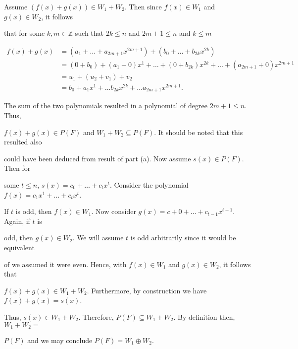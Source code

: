 \documentclass[12pt, a4paper]{article}
\begin{document}
\vspace{2mm}

Assume $(f(x)+g(x))\in W_1+W_2$. Then since $f(x)\in W_1$ and $g(x)\in W_2$, it follows\par that for some $k,m\in\mathbb{Z}$ such that $2k\leq n$ and $2m+1\leq n$ and $k\leq m$\par

\vspace{4mm}

\begin{equation} 
\begin{split}
 f(x)+g(x)  & = (a_1+\dots +a_{2m+1}x^{2m+1})+(b_0+\dots +b_{2k}x^{2k})\\
 & = (0+b_0)+(a_1+0)x^1+\dots + (0+b_{2k})x^{2k} +\dots + (a_{2m+1}+0)x^{2m+1}\\ \nonumber
 & = u_1+(u_2+v_1)+v_2 \\
& = b_0+a_1x^1+\dots b_{2k}x^{2k}+\dots a_{2m+1}x^{2m+1}.
\end{split}
\end{equation}

\vspace{4mm}

\par The sum of the two polynomials resulted in a polynomial of degree $2m+1\leq n$. Thus,\par $f(x)+g(x)\in P(F)$ and $W_1+W_2\subseteq P(F)$. It should be noted that this resulted also\par could have been deduced from result of part (a). Now assume $s(x)\in P(F)$. Then for\par some $t\leq n$, $s(x)=c_0+\dots +c_tx^t$. Consider the polynomial $f(x)=c_1x^1+\dots +c_tx^t$.\par If $t$ is odd, then $f(x)\in W_1$. Now consider $g(x)=c+0+\dots +c_{t-1}x^{t-1}$. Again, if $t$ is\par odd, then $g(x)\in W_2$. We will assume $t$ is odd arbitrarily since it would be equivalent\par of we assumed it were even. Hence, with $f(x)\in W_1$ and $g(x)\in W_2$, it follows that\par $f(x)+g(x)\in W_1+W_2$. Furthermore, by construction we have $f(x)+g(x)=s(x)$.\par Thus, $s(x)\in W_1+W_2$. Therefore, $P(F)\subseteq W_1+W_2$. By definition then, $W_1+W_2=$\par $P(F)$ and we may conclude $P(F)=W_1\oplus W_2$.\hspace{67mm}\blacksquare
\end{document}
